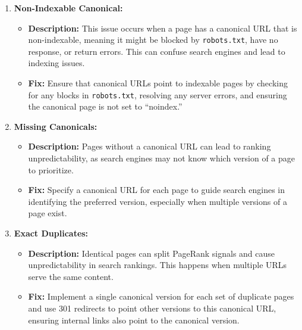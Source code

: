 \documentclass[
]{report}
\providecommand{\tightlist}{%
  \setlength{\itemsep}{0pt}\setlength{\parskip}{0pt}}\usepackage{longtable,booktabs,array}
\begin{document}
\begin{enumerate}
\def\labelenumi{\arabic{enumi}.}
\tightlist
\item
  \textbf{Non-Indexable Canonical:}

  \begin{itemize}
  \tightlist
  \item
    \textbf{Description:} This issue occurs when a page has a canonical
    URL that is non-indexable, meaning it might be blocked by
    \texttt{robots.txt}, have no response, or return errors. This can
    confuse search engines and lead to indexing issues.
  \item
    \textbf{Fix:} Ensure that canonical URLs point to indexable pages by
    checking for any blocks in \texttt{robots.txt}, resolving any server
    errors, and ensuring the canonical page is not set to ``noindex.''
  \end{itemize}
\item
  \textbf{Missing Canonicals:}

  \begin{itemize}
  \tightlist
  \item
    \textbf{Description:} Pages without a canonical URL can lead to
    ranking unpredictability, as search engines may not know which
    version of a page to prioritize.
  \item
    \textbf{Fix:} Specify a canonical URL for each page to guide search
    engines in identifying the preferred version, especially when
    multiple versions of a page exist.
  \end{itemize}
\item
  \textbf{Exact Duplicates:}

  \begin{itemize}
  \tightlist
  \item
    \textbf{Description:} Identical pages can split PageRank signals and
    cause unpredictability in search rankings. This happens when
    multiple URLs serve the same content.
  \item
    \textbf{Fix:} Implement a single canonical version for each set of
    duplicate pages and use 301 redirects to point other versions to
    this canonical URL, ensuring internal links also point to the
    canonical version.
  \end{itemize}
\end{enumerate}
\end{document}
